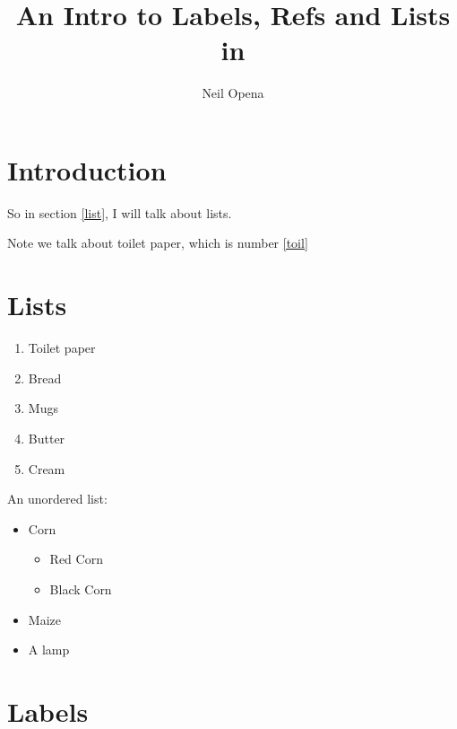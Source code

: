 \documentclass{article}
\author{Neil Opena}
\title{An Intro to Labels, Refs and Lists in {\Latex}}
\begin{document}
\maketitle

\section{Introduction}

So in section \ref{list}, I will talk about lists.

Note we talk about toilet paper, which is number \ref{toil}

\section{Lists\label{list}}

\begin{enumerate}
    \item Toilet paper \label{toil}
    \item Bread
    \item Mugs
    \item Butter
    \item Cream
\end{enumerate}

An unordered list:

\begin{itemize}
    \item Corn
    \begin{itemize}
        \item Red Corn
        \item Black Corn
    \end{itemize}
    \item Maize
    \item A lamp
\end{itemize}

\section{Labels}
\end{document}
